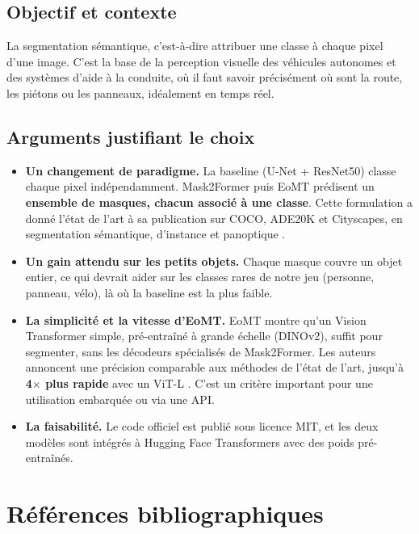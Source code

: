 \documentclass[11pt,a4paper]{article}
\begin{document}
\subsection*{Objectif et contexte}

La segmentation sémantique, c'est-à-dire attribuer une classe à chaque pixel
d'une image. C'est la base de la perception visuelle des véhicules autonomes et
des systèmes d'aide à la conduite, où il faut savoir précisément où sont la
route, les piétons ou les panneaux, idéalement en temps réel.

\subsection*{Arguments justifiant le choix}

\begin{itemize}
  \item \textbf{Un changement de paradigme.} La baseline (U-Net + ResNet50)
        classe chaque pixel indépendamment. Mask2Former puis EoMT prédisent un
        \textbf{ensemble de masques, chacun associé à une classe}. Cette
        formulation a donné l'état de l'art à sa publication sur COCO, ADE20K
        et Cityscapes, en segmentation sémantique, d'instance et panoptique
        \cite{cheng2022}.
  \item \textbf{Un gain attendu sur les petits objets.} Chaque masque couvre un
        objet entier, ce qui devrait aider sur les classes rares de notre jeu
        (personne, panneau, vélo), là où la baseline est la plus faible.
  \item \textbf{La simplicité et la vitesse d'EoMT.} EoMT montre qu'un Vision
        Transformer simple, pré-entraîné à grande échelle (DINOv2), suffit pour
        segmenter, sans les décodeurs spécialisés de Mask2Former. Les auteurs
        annoncent une précision comparable aux méthodes de l'état de l'art,
        jusqu'à \textbf{4$\times$ plus rapide} avec un ViT-L
        \cite{kerssies2025vitsecretlyimagesegmentation}. C'est un critère
        important pour une utilisation embarquée ou via une API.
  \item \textbf{La faisabilité.} Le code officiel est publié sous licence MIT,
        et les deux modèles sont intégrés à Hugging Face Transformers avec des
        poids pré-entraînés.
\end{itemize}

\section*{Références bibliographiques}
\end{document}
